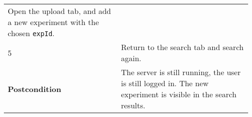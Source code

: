 \begin{longtable}[c]{@{}ll@{}}
\begin{minipage}[t]{0.63\columnwidth}\raggedright\strut
Open the upload tab, and add a new experiment with the chosen
\texttt{expId}.
\strut\end{minipage}\tabularnewline
\begin{minipage}[t]{0.31\columnwidth}\raggedright\strut
5
\strut\end{minipage} &
\begin{minipage}[t]{0.63\columnwidth}\raggedright\strut
Return to the search tab and search again.
\strut\end{minipage}\tabularnewline
\begin{minipage}[t]{0.31\columnwidth}\raggedright\strut
\textbf{Postcondition}
\strut\end{minipage} &
\begin{minipage}[t]{0.63\columnwidth}\raggedright\strut
The server is still running, the user is still logged in. The new
experiment is visible in the search results.
\strut\end{minipage}\tabularnewline
\bottomrule
\end{longtable}

